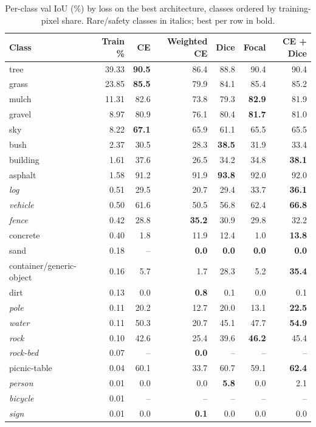 \begin{table}[t]
\centering
\small
\caption{Per-class val IoU (\%) by loss on the best architecture, classes ordered by training-pixel share. Rare/safety classes in italics; best per row in bold.}
\label{tab:per_class_losses}
\setlength{\tabcolsep}{3pt}
\begin{tabular}{lrrrrrr}
\toprule
Class & Train \% & CE & Weighted CE & Dice & Focal & CE + Dice \\
\midrule
tree & 39.33 & \textbf{90.5} & 86.4 & 88.8 & 90.4 & 90.4 \\
grass & 23.85 & \textbf{85.5} & 79.9 & 84.1 & 85.4 & 85.2 \\
mulch & 11.31 & 82.6 & 73.8 & 79.3 & \textbf{82.9} & 81.9 \\
gravel & 8.97 & 80.9 & 76.1 & 80.4 & \textbf{81.7} & 81.0 \\
sky & 8.22 & \textbf{67.1} & 65.9 & 61.1 & 65.5 & 65.5 \\
bush & 2.37 & 30.5 & 28.3 & \textbf{38.5} & 31.9 & 33.4 \\
building & 1.61 & 37.6 & 26.5 & 34.2 & 34.8 & \textbf{38.1} \\
asphalt & 1.58 & 91.2 & 91.9 & \textbf{93.8} & 92.0 & 92.0 \\
\emph{log} & 0.51 & 29.5 & 20.7 & 29.4 & 33.7 & \textbf{36.1} \\
\emph{vehicle} & 0.50 & 61.6 & 50.5 & 56.8 & 62.4 & \textbf{66.8} \\
\emph{fence} & 0.42 & 28.8 & \textbf{35.2} & 30.9 & 29.8 & 32.2 \\
concrete & 0.40 & 1.8 & 11.9 & 12.4 & 1.0 & \textbf{13.8} \\
sand & 0.18 & -- & \textbf{0.0} & \textbf{0.0} & \textbf{0.0} & \textbf{0.0} \\
container/generic-object & 0.16 & 5.7 & 1.7 & 28.3 & 5.2 & \textbf{35.4} \\
dirt & 0.13 & 0.0 & \textbf{0.8} & 0.1 & 0.0 & 0.1 \\
\emph{pole} & 0.11 & 20.2 & 12.7 & 20.0 & 13.1 & \textbf{22.5} \\
\emph{water} & 0.11 & 50.3 & 20.7 & 45.1 & 47.7 & \textbf{54.9} \\
\emph{rock} & 0.10 & 42.6 & 25.4 & 39.6 & \textbf{46.2} & 45.4 \\
\emph{rock-bed} & 0.07 & -- & \textbf{0.0} & -- & -- & -- \\
picnic-table & 0.04 & 60.1 & 33.7 & 60.7 & 59.1 & \textbf{62.4} \\
\emph{person} & 0.01 & 0.0 & 0.0 & \textbf{5.8} & 0.0 & 2.1 \\
\emph{bicycle} & 0.01 & -- & -- & -- & -- & -- \\
\emph{sign} & 0.01 & 0.0 & \textbf{0.1} & 0.0 & 0.0 & 0.0 \\
\bottomrule
\end{tabular}
\end{table}
